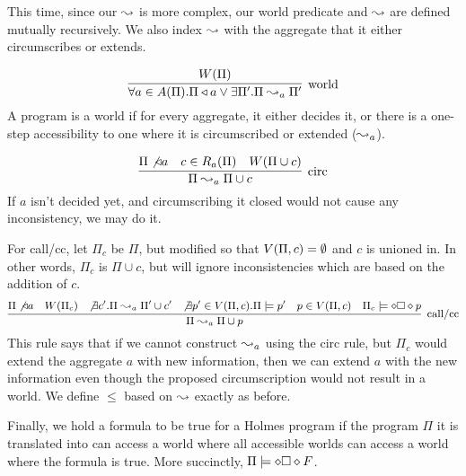 This time, since our $\leadsto$ is more complex, our world predicate and $\leadsto$ are defined mutually recursively.
We also index $\leadsto$ with the aggregate that it either circumscribes or extends.

\[
	\infer[\textrm{world}]{\forall a \in \aggset(\Pi). \Pi \decides a \vee \exists \Pi'. \Pi \stepass_a \Pi'}{\world{\Pi}}
\]
A program is a world if for every aggregate, it either decides it, or there is a one-step accessibility to one where it is circumscribed or extended ($\leadsto_a$).

\[
	\infer[\textrm{circ}]{\Pi \stepass_a \Pi \cup c}{\Pi \not \decides a & c \in \circset_a(\Pi) & W(\Pi \cup c)}
\]
If $a$ isn't decided yet, and circumscribing it closed would not cause any inconsistency, we may do it.

For call/cc, let $\Pi_c$ be $\Pi$, but modified so that $V(\Pi, c) = \emptyset$ and $c$ is unioned in.
In other words, $\Pi_c$ is $\Pi \cup c$, but will ignore inconsistencies which are based on the addition of $c$.
\[\small
	\infer[\textrm{call/cc}]{\Pi \stepass_a \Pi \cup p}{\Pi \not \decides a & \world{\Pi_c} & \not \exists c'. \Pi \stepass_a \Pi' \cup c' & \not \exists p' \in \viol{\Pi}{c}. \Pi \models p' & p \in \viol{\Pi}{c} & \Pi_c \models \dia \boks \dia p}
\]
This rule says that if we cannot construct $\leadsto_a$ using the circ rule, but $\Pi_c$ would extend the aggregate $a$ with new information, then we can extend $a$ with the new information even though the proposed circumscription would not result in a world.
We define $\leq$ based on $\leadsto$ exactly as before.

Finally, we hold a formula to be true for a Holmes program if the program $\Pi$ it is translated into can access a world where all accessible worlds can access a world where the formula is true. More succinctly, $\Pi \models \diamond \square \diamond F$.
